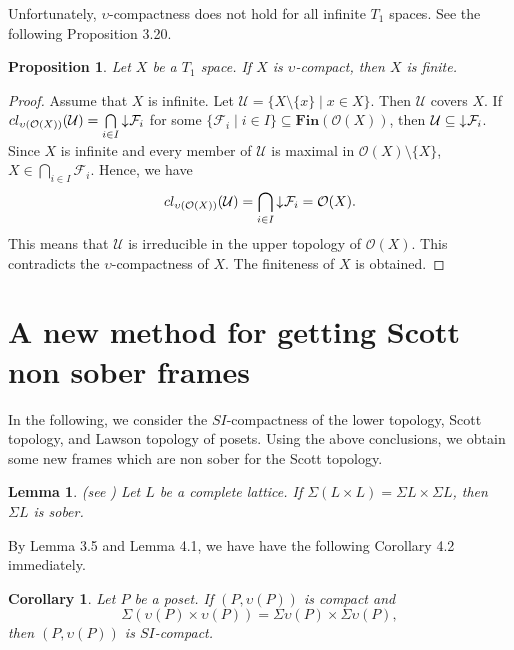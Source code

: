 \documentclass[preprint,12pt]{elsarticle}
\numberwithin{equation}{section}
\newtheorem{lemma}[theorem]{Lemma}
\newtheorem{proposition}[theorem]{Proposition}
\newtheorem{corollary}[theorem]{Corollary}
\newcommand{\dn}{\mathord{\downarrow}\hspace{0.05em}}
\begin{document}
\quad Unfortunately, $\upsilon$-compactness does not hold for all infinite $T_{1}$ spaces. See the following Proposition 3.20.

\begin{proposition} Let $X$ be a $T_{1}$ space. If $X$ is $\upsilon$-compact, then $X$ is finite.
\end{proposition}

\begin{proof}Assume that $X$ is infinite. Let $\mathcal{U}=\{X\setminus\{x\}\mid x\in X\}$. Then $\mathcal{U}$ covers $X$. If $cl_{\upsilon(\mathcal{O}(X))}(\mathcal{U})=\bigcap\limits_{i\in I}\dn \mathcal{F}_{i}$ for some $\{ \mathcal{F}_{i}\mid i\in I\}\subseteq \mathbf{Fin}(\mathcal{O}(X))$, then $\mathcal{U}\subseteq\dn \mathcal{F}_{i}$. Since $X$ is infinite and every member of $\mathcal{U}$ is maximal in $\mathcal{O}(X)\setminus\{X\}$, $X\in\bigcap\limits_{i\in I}\mathcal{F}_{i}$. Hence, we have $$cl_{\upsilon(\mathcal{O}(X))}(\mathcal{U})=\bigcap\limits_{i\in I}\dn \mathcal{F}_{i}=\mathcal{O}(X).$$ This means that $\mathcal{U}$ is irreducible in the upper topology of $\mathcal{O}(X)$. This contradicts the $\upsilon$-compactness of $X$. The finiteness of $X$ is obtained.\end{proof}



\section{A new method for getting Scott non sober frames}

\quad In the following, we consider the $SI$-compactness of the lower topology, Scott topology, and Lawson topology of posets. Using the above conclusions, we obtain some new frames which are non sober for the Scott topology.

\begin{lemma} (see \cite{GG03}) Let $L$ be a complete lattice. If $\Sigma (L\times L)=\Sigma L\times\Sigma L$, then $\Sigma L$ is sober.
\end{lemma}

By Lemma 3.5 and Lemma 4.1, we have have the following Corollary 4.2 immediately.

\begin{corollary} Let $P$ be a poset. If $(P,\upsilon(P))$ is compact and $$\Sigma (\upsilon(P)\times \upsilon(P))=\Sigma \upsilon(P)\times\Sigma \upsilon(P),$$ then $(P,\upsilon(P))$ is $SI$-compact.

\end{corollary}
\end{document}

